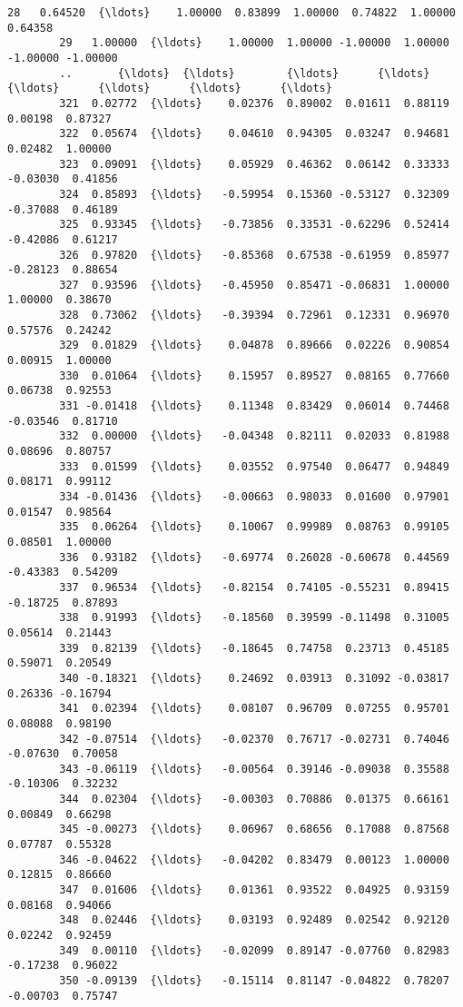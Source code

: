 \documentclass[11pt]{article}
\begin{document}
\begin{Verbatim}[commandchars=\\\{\}]
        28   0.64520  {\ldots}    1.00000  0.83899  1.00000  0.74822  1.00000  0.64358   
        29   1.00000  {\ldots}    1.00000  1.00000 -1.00000  1.00000 -1.00000 -1.00000   
        ..       {\ldots}  {\ldots}        {\ldots}      {\ldots}      {\ldots}      {\ldots}      {\ldots}      {\ldots}   
        321  0.02772  {\ldots}    0.02376  0.89002  0.01611  0.88119  0.00198  0.87327   
        322  0.05674  {\ldots}    0.04610  0.94305  0.03247  0.94681  0.02482  1.00000   
        323  0.09091  {\ldots}    0.05929  0.46362  0.06142  0.33333 -0.03030  0.41856   
        324  0.85893  {\ldots}   -0.59954  0.15360 -0.53127  0.32309 -0.37088  0.46189   
        325  0.93345  {\ldots}   -0.73856  0.33531 -0.62296  0.52414 -0.42086  0.61217   
        326  0.97820  {\ldots}   -0.85368  0.67538 -0.61959  0.85977 -0.28123  0.88654   
        327  0.93596  {\ldots}   -0.45950  0.85471 -0.06831  1.00000  1.00000  0.38670   
        328  0.73062  {\ldots}   -0.39394  0.72961  0.12331  0.96970  0.57576  0.24242   
        329  0.01829  {\ldots}    0.04878  0.89666  0.02226  0.90854  0.00915  1.00000   
        330  0.01064  {\ldots}    0.15957  0.89527  0.08165  0.77660  0.06738  0.92553   
        331 -0.01418  {\ldots}    0.11348  0.83429  0.06014  0.74468 -0.03546  0.81710   
        332  0.00000  {\ldots}   -0.04348  0.82111  0.02033  0.81988  0.08696  0.80757   
        333  0.01599  {\ldots}    0.03552  0.97540  0.06477  0.94849  0.08171  0.99112   
        334 -0.01436  {\ldots}   -0.00663  0.98033  0.01600  0.97901  0.01547  0.98564   
        335  0.06264  {\ldots}    0.10067  0.99989  0.08763  0.99105  0.08501  1.00000   
        336  0.93182  {\ldots}   -0.69774  0.26028 -0.60678  0.44569 -0.43383  0.54209   
        337  0.96534  {\ldots}   -0.82154  0.74105 -0.55231  0.89415 -0.18725  0.87893   
        338  0.91993  {\ldots}   -0.18560  0.39599 -0.11498  0.31005  0.05614  0.21443   
        339  0.82139  {\ldots}   -0.18645  0.74758  0.23713  0.45185  0.59071  0.20549   
        340 -0.18321  {\ldots}    0.24692  0.03913  0.31092 -0.03817  0.26336 -0.16794   
        341  0.02394  {\ldots}    0.08107  0.96709  0.07255  0.95701  0.08088  0.98190   
        342 -0.07514  {\ldots}   -0.02370  0.76717 -0.02731  0.74046 -0.07630  0.70058   
        343 -0.06119  {\ldots}   -0.00564  0.39146 -0.09038  0.35588 -0.10306  0.32232   
        344  0.02304  {\ldots}   -0.00303  0.70886  0.01375  0.66161  0.00849  0.66298   
        345 -0.00273  {\ldots}    0.06967  0.68656  0.17088  0.87568  0.07787  0.55328   
        346 -0.04622  {\ldots}   -0.04202  0.83479  0.00123  1.00000  0.12815  0.86660   
        347  0.01606  {\ldots}    0.01361  0.93522  0.04925  0.93159  0.08168  0.94066   
        348  0.02446  {\ldots}    0.03193  0.92489  0.02542  0.92120  0.02242  0.92459   
        349  0.00110  {\ldots}   -0.02099  0.89147 -0.07760  0.82983 -0.17238  0.96022   
        350 -0.09139  {\ldots}   -0.15114  0.81147 -0.04822  0.78207 -0.00703  0.75747   
        

\end{Verbatim}
\end{document}
